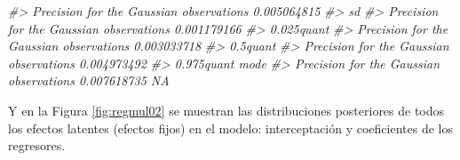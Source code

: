\documentclass[
]{book}
\newenvironment{Shaded}{\begin{snugshade}}{\end{snugshade}}
\newcommand{\AttributeTok}[1]{\textcolor[rgb]{0.77,0.63,0.00}{#1}}
\newcommand{\CommentTok}[1]{\textcolor[rgb]{0.56,0.35,0.01}{\textit{#1}}}
\newcommand{\ControlFlowTok}[1]{\textcolor[rgb]{0.13,0.29,0.53}{\textbf{#1}}}
\newcommand{\DecValTok}[1]{\textcolor[rgb]{0.00,0.00,0.81}{#1}}
\newcommand{\FloatTok}[1]{\textcolor[rgb]{0.00,0.00,0.81}{#1}}
\newcommand{\FunctionTok}[1]{\textcolor[rgb]{0.00,0.00,0.00}{#1}}
\newcommand{\NormalTok}[1]{#1}
\newcommand{\OtherTok}[1]{\textcolor[rgb]{0.56,0.35,0.01}{#1}}
\newcommand{\SpecialCharTok}[1]{\textcolor[rgb]{0.00,0.00,0.00}{#1}}
\newcommand{\StringTok}[1]{\textcolor[rgb]{0.31,0.60,0.02}{#1}}
\begin{document}
\begin{Shaded}
\begin{Highlighting}[]
\CommentTok{\#\textgreater{} Precision for the Gaussian observations 0.005064815}
\CommentTok{\#\textgreater{}                                                  sd}
\CommentTok{\#\textgreater{} Precision for the Gaussian observations 0.001179166}
\CommentTok{\#\textgreater{}                                          0.025quant}
\CommentTok{\#\textgreater{} Precision for the Gaussian observations 0.003033718}
\CommentTok{\#\textgreater{}                                            0.5quant}
\CommentTok{\#\textgreater{} Precision for the Gaussian observations 0.004973492}
\CommentTok{\#\textgreater{}                                          0.975quant mode}
\CommentTok{\#\textgreater{} Precision for the Gaussian observations 0.007618735   NA}
\end{Highlighting}
\end{Shaded}

Y en la Figura \ref{fig:regmul02} se muestran las distribuciones posteriores de todos los efectos latentes (efectos fijos) en el modelo: interceptación y coeficientes de los regresores.

\begin{Shaded}
\end{Shaded}
\end{document}
